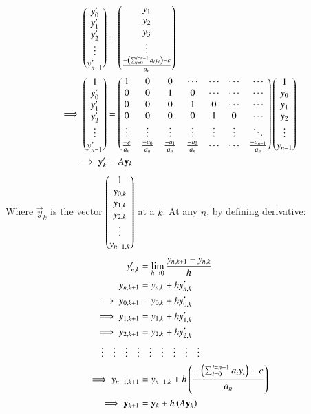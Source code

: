 \documentclass[journal]{IEEEtran}
\begin{document}
\begin{align}
    \begin{pmatrix}y_{0}^{\prime}\\y_{1}^{\prime}\\y_{2}^{\prime}\\ \vdots\\y^{\prime}_{n-1}\end{pmatrix}&=\begin{pmatrix}y_{1}\\y_{2}\\y_{3}\\ \vdots\\ \frac{-\left(\sum_{i=0}^{i=n-1}a_iy_i\right)-c}{a_n}\end{pmatrix}\\
    \implies  \begin{pmatrix}1\\y_{0}^{\prime}\\y_{1}^{\prime}\\y_{2}^{\prime}\\ \vdots\\y^{\prime}_{n-1}\end{pmatrix}&=\begin{pmatrix}1&0&0&\cdots&\cdots&\cdots&\cdots\\0&0&1&0&\cdots&\cdots&\cdots\\0&0&0&1&0&\cdots&\cdots\\0&0&0&0&1&0&\cdots\\ \vdots&\vdots&\vdots&\vdots&\vdots&\vdots&\ddots\\ \frac{-c}{a_n}&\frac{-a_{0}}{a_n}&\frac{-a_{1}}{a_n}&\frac{-a_{2}}{a_n}&\cdots&\cdots&\frac{-a_{n-1}}{a_n}\end{pmatrix}\begin{pmatrix}1\\y_{0}\\y_{1}\\y_{2}\\ \vdots\\y_{n-1}\end{pmatrix}\\
    \implies \mathbf{y}_k^{\prime}&=A\mathbf{y}_k
\end{align}
Where $\vec{y}_k$ is the vector $\begin{pmatrix}1\\y_{0,k}\\y_{1,k}\\y_{2,k}\\ \vdots\\y_{n-1,k}\end{pmatrix}$ at a $k$.
At any $n$, by defining derivative:
\begin{align}
	y_{n,k}^{\prime} &= \lim_{h\to 0}\frac{y_{n,k+1} - y_{n,k}}{h}\\
	y_{n,k+1} &= y_{n,k} + hy_{n,k}^{\prime}\\
    \implies y_{0,k+1} &= y_{0,k} + hy_{0,k}^{\prime}\\
    \implies y_{1,k+1} &= y_{1,k} + hy_{1,k}^{\prime}\\
    \implies y_{2,k+1} &= y_{2,k} + hy_{2,k}^{\prime}\\
\vdots\quad\vdots\quad\vdots\quad\vdots&\quad\vdots\quad\vdots\quad\vdots\quad\vdots\quad\vdots\\
    \implies y_{n-1,k+1} &= y_{n-1,k} + h\left(\frac{-\left(\sum_{i=0}^{i=n-1}a_iy_i\right)-c}{a_n}\right)\\
    \implies  \mathbf{y}_{k+1}&=\mathbf{y}_k+h\left(A\mathbf{y}_k\right)
\end{align}
\end{document}
